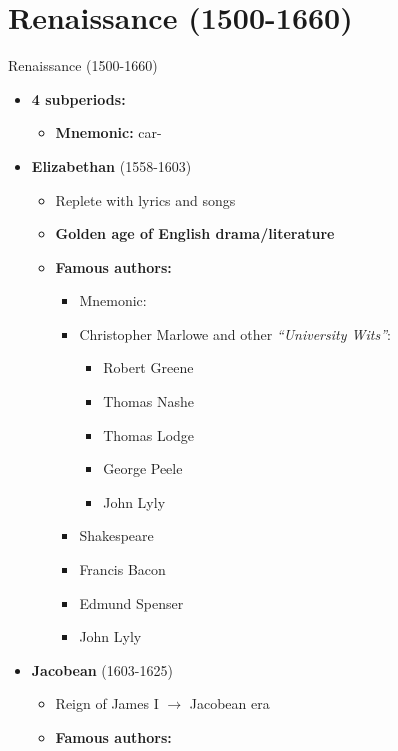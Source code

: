 \documentclass[
  12pt,
    progressbar=frametitle]{beamer}
\providecommand{\tightlist}{%
  \setlength{\itemsep}{0pt}\setlength{\parskip}{0pt}}
\begin{document}
\section{Renaissance (1500-1660)}
\begin{frame}[allowframebreaks]
{Renaissance (1500-1660)}
\begin{itemize}
\tightlist
\item
  \textbf{4 subperiods:}

  \begin{itemize}
  \tightlist
  \item
    \textbf{Mnemonic:}  car-
  \end{itemize}
\item
  \textbf{Elizabethan} (1558-1603)

  \begin{itemize}
  \tightlist
  \item
    Replete with lyrics and songs
  \item
    \textbf{Golden age of English drama/literature}
  \item
    \textbf{Famous authors:}

    \begin{itemize}
    \tightlist
    \item
      Mnemonic: 
    \item
      Christopher Marlowe and other \emph{``University Wits''}:

      \begin{itemize}
      \tightlist
      \item
        Robert Greene
      \item
        Thomas Nashe
      \item
        Thomas Lodge
      \item
        George Peele
      \item
        John Lyly
      \end{itemize}
    \item
      Shakespeare
    \item
      Francis Bacon
    \item
      Edmund Spenser
    \item
      John Lyly
    \end{itemize}
  \end{itemize}
\item
  \textbf{Jacobean} (1603-1625)

  \begin{itemize}
  \tightlist
  \item
    Reign of James I \(\rightarrow\) Jacobean era
  \item
    \textbf{Famous authors:}


\end{itemize}
\end{itemize}
\end{frame}
\end{document}
